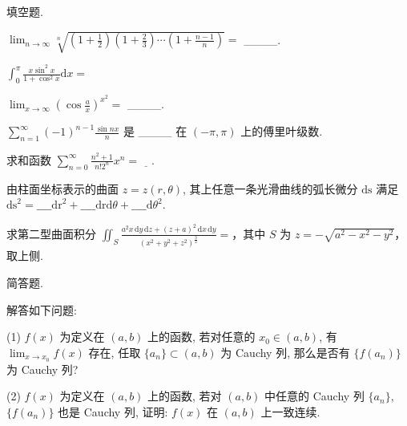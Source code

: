 \par{}
填空题.\par
$\lim_{n\to\infty}\sqrt[n]{\left(1+\frac{1}{2}\right)\left(1+\frac{2}{3}\right)\cdots\left(1+\frac{n-1}{n}\right)}=$  \_\_\_\_.\par
$\int_0^\pi \frac{x\sin^2x}{1 + \cos^2x}\mathrm{d}x =$\par
$\lim_{x\to\infty}\left(\cos\frac{a}{x}\right)^{x^{2}}=$  \_\_\_\_.\par
$\sum_{n=1}^{\infty} (-1)^{n-1} \frac{\sin nx}{n}$ 是 \_\_\_\_ 在 $(- \pi, \pi)$ 上的傅里叶级数.\par
求和函数 $\sum_{n=0}^{\infty} \frac{n^{2}+1}{n!2^{n}} x^{n} = \underline{\quad}$.\par
由柱面坐标表示的曲面 $z = z(r, \theta)$, 其上任意一条光滑曲线的弧长微分 $\mathrm{ds}$ 满足 $\mathrm{ds}^2 = \_\_\_\_ \mathrm{dr}^2 + \_\_\_\_ \mathrm{dr} \mathrm{d}\theta + \_\_\_\_ \mathrm{d}\theta^2$.\par
求第二型曲面积分 $\iint_{S} \frac{a^2 x \, \mathrm{d}y \, \mathrm{d}z + (z + a)^2 \, \mathrm{d}x \, \mathrm{d}y}{(x^2 + y^2 + z^2)^{\frac{3}{2}}} =$，其中 $S$ 为 $z = -\sqrt{a^2 - x^2 - y^2}$，取上侧.\par
\par{}
简答题.\par
解答如下问题:\par
(1) $f(x)$ 为定义在 $(a, b)$ 上的函数, 若对任意的 $x_0 \in (a, b)$, 有 $\lim_{x \to x_0} f(x)$ 存在, 任取 $\{a_n\} \subset (a, b)$ 为 Cauchy 列, 那么是否有 $\{f(a_n)\}$ 为 Cauchy 列?\par
(2) $f(x)$ 为定义在 $(a, b)$ 上的函数, 若对 $(a, b)$ 中任意的 Cauchy 列 $\{a_n\}$, $\{f(a_n)\}$ 也是 Cauchy 列, 证明: $f(x)$ 在 $(a, b)$ 上一致连续.\par
